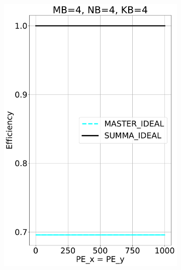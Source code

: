 \begin{figure}[t!]
  \centering
  \begin{subfigure}{0.32\columnwidth}
    \includegraphics[width=\linewidth]{figures/efficiency_cost_ideal_4_4_4.pdf}
  \end{subfigure}
  \hfill
  \begin{subfigure}{0.32\columnwidth}

\end{subfigure}
\end{figure}
